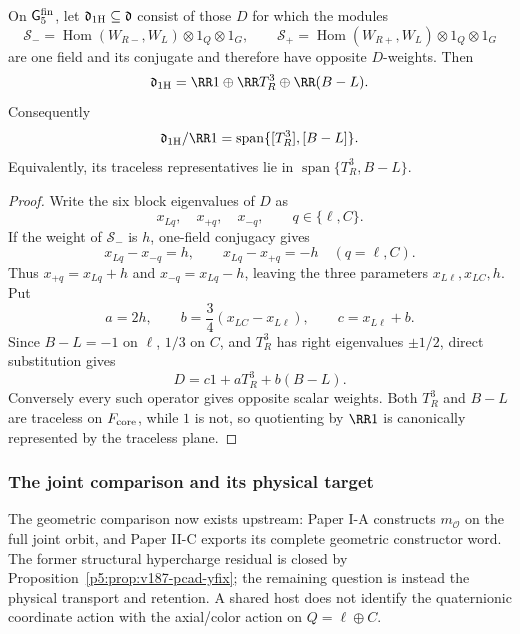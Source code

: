 \documentclass[12pt,a4paper]{article}
\begin{document}
\begin{lemma}
\label{p5:lem:intrinsic-abelian-centralizer-plane}
On \(\mathsf G_5^{\rm fin}\), let
\(\mathfrak d_{\rm 1H}\subseteq\mathfrak d\) consist of those \(D\) for which
the modules
\[
\mathcal S_-=\operatorname{Hom}(W_{R-},W_L)\otimes1_Q\otimes1_G,
\qquad
\mathcal S_+=\operatorname{Hom}(W_{R+},W_L)\otimes1_Q\otimes1_G
\]
are one field and its conjugate and therefore have opposite \(D\)-weights.
Then
\[
\mathfrak d_{\rm 1H}
=\RR1\oplus\RR T_R^3\oplus\RR(B-L).
\]
Consequently
\begin{equation}
\label{p5:eq:intrinsic-abelian-centralizer-plane}
\mathfrak d_{\rm 1H}/\RR1
=\operatorname{span}\{[T_R^3],[B-L]\}.
\end{equation}
Equivalently, its traceless representatives lie in
\(\operatorname{span}\{T_R^3,B-L\}\).
\end{lemma}

\begin{proof}
Write the six block eigenvalues of \(D\) as
\[
x_{Lq},\quad x_{+q},\quad x_{-q},
\qquad q\in\{\ell,C\}.
\]
If the weight of \(\mathcal S_-\) is \(h\), one-field conjugacy gives
\[
x_{Lq}-x_{-q}=h,\qquad
x_{Lq}-x_{+q}=-h
\quad(q=\ell,C).
\]
Thus \(x_{+q}=x_{Lq}+h\) and \(x_{-q}=x_{Lq}-h\), leaving the three
parameters \(x_{L\ell},x_{LC},h\).  Put
\[
a=2h,\qquad
b=\frac34(x_{LC}-x_{L\ell}),\qquad
c=x_{L\ell}+b.
\]
Since \(B-L=-1\) on \(\ell\), \(1/3\) on \(C\), and \(T_R^3\) has right
eigenvalues \(\pm1/2\), direct substitution gives
\[
D=c1+aT_R^3+b(B-L).
\]
Conversely every such operator gives opposite scalar weights.  Both
\(T_R^3\) and \(B-L\) are traceless on \(F_{\rm core}\), while \(1\) is not,
so quotienting by \(\RR1\) is canonically represented by the traceless plane.
\end{proof}

\subsubsection{The joint comparison and its physical target}

The geometric comparison now exists upstream:
Paper I-A constructs \(m_{\mathcal O}\) on the full joint orbit,
and Paper II-C exports its complete geometric constructor word.
The former structural hypercharge residual is closed by Proposition~\ref{p5:prop:v187-pcad-yfix}; the remaining question is instead the physical
transport and retention.  A shared host does not identify the
quaternionic coordinate action with the axial/color action on
\(Q=\ell\oplus C\).
\end{document}
